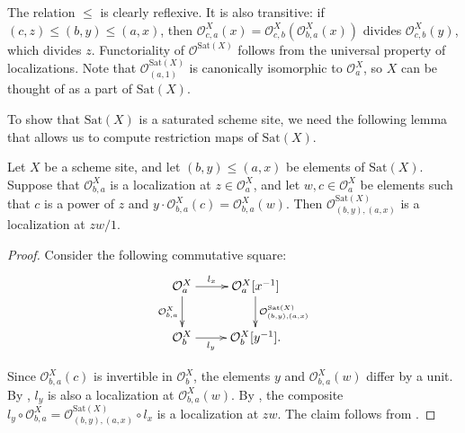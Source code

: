 \documentclass[reqno]{amsart}
\theoremstyle{definition}
\theoremstyle{remark}
\numberwithin{figure}{section}
\begin{document}
The relation $\leq$ is clearly reflexive.
It is also transitive: if $(c,z) \leq (b,y) \leq (a,x)$, then $\mathcal{O}^X_{c,a}(x) = \mathcal{O}^X_{c,b}(\mathcal{O}^X_{b,a}(x))$ divides $\mathcal{O}^X_{c,b}(y)$, which divides $z$.
Functoriality of $\mathcal{O}^{\mathrm{Sat}(X)}$ follows from the universal property of localizations.
Note that $\mathcal{O}^{\mathrm{Sat}(X)}_{(a,1)}$ is canonically isomorphic to $\mathcal{O}^X_a$, so $X$ can be thought of as a part of $\mathrm{Sat}(X)$.

To show that $\mathrm{Sat}(X)$ is a saturated scheme site, we need the following lemma that allows us to compute restriction maps of $\mathrm{Sat}(X)$.

\begin{lem}
Let $X$ be a scheme site, and let $(b,y) \leq (a,x)$ be elements of $\mathrm{Sat}(X)$.
Suppose that $\mathcal{O}^X_{b,a}$ is a localization at $z \in \mathcal{O}^X_a$, and let $w,c \in \mathcal{O}^X_a$ be elements such that $c$ is a power of $z$ and $y \cdot \mathcal{O}^X_{b,a}(c) = \mathcal{O}^X_{b,a}(w)$.
Then $\mathcal{O}^{\mathrm{Sat}(X)}_{(b,y),(a,x)}$ is a localization at $z w / 1$.
\end{lem}
\begin{proof}
Consider the following commutative square:
\[ \xymatrix{ \mathcal{O}^X_a \ar[r]^-{l_x} \ar[d]_{\mathcal{O}^X_{b,a}} & \mathcal{O}^X_a[x^{-1}] \ar[d]^{\mathcal{O}^{\mathrm{Sat}(X)}_{(b,y),(a,x)}} \\
	      \mathcal{O}^X_b \ar[r]_-{l_y} & \mathcal{O}^X_b[y^{-1}].
            } \]

Since $\mathcal{O}^X_{b,a}(c)$ is invertible in $\mathcal{O}^X_b$, the elements $y$ and $\mathcal{O}^X_{b,a}(w)$ differ by a unit.
By , $l_y$ is also a localization at $\mathcal{O}^X_{b,a}(w)$.
By , the composite $l_y \circ \mathcal{O}^X_{b,a} = \mathcal{O}^{\mathrm{Sat}(X)}_{(b,y),(a,x)} \circ l_x$ is a localization at $z w$.
The claim follows from .
\end{proof}
\end{document}
